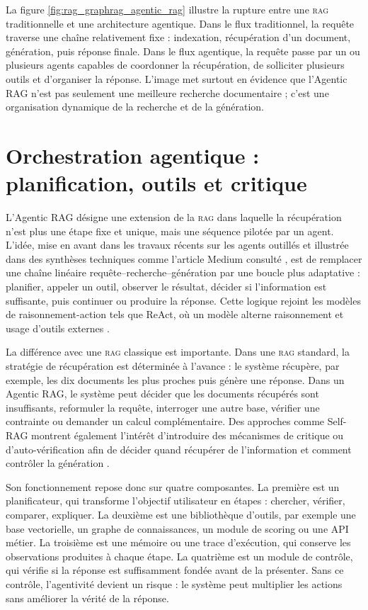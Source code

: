 \documentclass[12pt,twoside]{report}
\newcommand{\RAG}{\textsc{rag}}
\begin{document}
La figure \ref{fig:rag_graphrag_agentic_rag} illustre la rupture entre une \RAG{} traditionnelle et une architecture agentique. Dans le flux traditionnel, la requête traverse une chaîne relativement fixe : indexation, récupération d'un document, génération, puis réponse finale. Dans le flux agentique, la requête passe par un ou plusieurs agents capables de coordonner la récupération, de solliciter plusieurs outils et d'organiser la réponse. L'image met surtout en évidence que l'Agentic RAG n'est pas seulement une meilleure recherche documentaire ; c'est une organisation dynamique de la recherche et de la génération.

\section{Orchestration agentique : planification, outils et critique}

L'Agentic RAG désigne une extension de la \RAG{} dans laquelle la récupération n'est plus une étape fixe et unique, mais une séquence pilotée par un agent. L'idée, mise en avant dans les travaux récents sur les agents outillés et illustrée dans des synthèses techniques comme l'article Medium consulté \cite{nimeesha2024agenticrag}, est de remplacer une chaîne linéaire \og requête--recherche--génération \fg{} par une boucle plus adaptative : planifier, appeler un outil, observer le résultat, décider si l'information est suffisante, puis continuer ou produire la réponse. Cette logique rejoint les modèles de raisonnement-action tels que ReAct, où un modèle alterne raisonnement et usage d'outils externes \cite{yao2023react}.

La différence avec une \RAG{} classique est importante. Dans une \RAG{} standard, la stratégie de récupération est déterminée à l'avance : le système récupère, par exemple, les dix documents les plus proches puis génère une réponse. Dans un Agentic RAG, le système peut décider que les documents récupérés sont insuffisants, reformuler la requête, interroger une autre base, vérifier une contrainte ou demander un calcul complémentaire. Des approches comme Self-RAG montrent également l'intérêt d'introduire des mécanismes de critique ou d'auto-vérification afin de décider quand récupérer de l'information et comment contrôler la génération \cite{asai2024selfrag}.

Son fonctionnement repose donc sur quatre composantes. La première est un planificateur, qui transforme l'objectif utilisateur en étapes : chercher, vérifier, comparer, expliquer. La deuxième est une bibliothèque d'outils, par exemple une base vectorielle, un graphe de connaissances, un module de scoring ou une API métier. La troisième est une mémoire ou une trace d'exécution, qui conserve les observations produites à chaque étape. La quatrième est un module de contrôle, qui vérifie si la réponse est suffisamment fondée avant de la présenter. Sans ce contrôle, l'agentivité devient un risque : le système peut multiplier les actions sans améliorer la vérité de la réponse.
\end{document}

